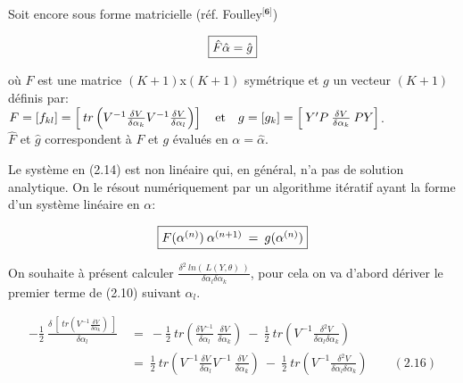 \documentclass[11pt,fleqn]{book} %
\begin{document}
	\vspace{1em}
	
	Soit encore sous forme matricielle (réf. Foulley$^\textbf{[6]}$)
	
	\begin{equation}
		\fbox{$
			\hat{F}\hat{\alpha}=\hat{g}
			$}
	\end{equation}
	
	\vspace{0.5em}
	
	où $F$ est une matrice $(K+1)$x$(K+1)$ symétrique et $g$ un vecteur $(K+1)$ définis par:\\ 
	$F=[f_{kl}]=\left[\:tr\left(V^{-1} \frac{ \delta V }{\delta \alpha_k}  V^{-1} \frac{ \delta V} {\delta \alpha_l}\right) \right] \quad\textnormal{et}\quad g=[g_k]=\left[\:Y'P\:\frac{ \delta V }{\delta \alpha_k}\: P Y\right]$.\\
	$\hat{F}$ et $\hat{g}$ correspondent à $F$ et $g$ évalués en $\alpha=\hat{\alpha}$.
	
	\vspace{2em}
	
	Le système en (2.14) est non linéaire qui, en général, n'a pas de solution analytique. On le résout numériquement par un algorithme itératif ayant la forme d'un système linéaire en $\alpha$:
	
	\begin{equation}
		\fbox{$
			F(\alpha^{(n)})\:\alpha^{(n+1)}\:=\:g(\alpha^{(n)})
			$}
	\end{equation}
	
	
	\newpage
	
	
	
	On souhaite à présent calculer $\frac{\delta^2 \: ln( \:\textit{L}(Y,\theta)\:) }{\delta \alpha_l \delta \alpha_k} $, pour cela on va d'abord dériver le premier terme de (2.10) suivant $\alpha_l$.
	
	\begin{align*}
		- \frac{1}{2}  \: \frac{ \delta \: \left[ \: tr\left( V^{-1} \frac{ \delta V }{\delta \alpha_k} \right) \: \right] }{\delta \alpha_l } \: &= \:  -\frac{1}{2} \: tr\left( \frac{\delta V^{-1}}{\delta \alpha_l}\:  \frac{ \delta V }{\delta \alpha_k} \right)  \:-\: \frac{1}{2} \: tr\left( V^{-1} \frac{ \delta^2 V }{\delta \alpha_l \delta \alpha_k} \right)\\
		&= \:  \frac{1}{2} \: tr\left( V^{-1} \frac{ \delta V }{\delta \alpha_l} V^{-1}\:  \frac{ \delta V }{\delta \alpha_k} \right)  \:-\: \frac{1}{2} \: tr\left( V^{-1} \frac{ \delta^2 V }{\delta \alpha_l \delta \alpha_k} \right) \quad\quad (2.16)
	\end{align*}
	
\end{document}
